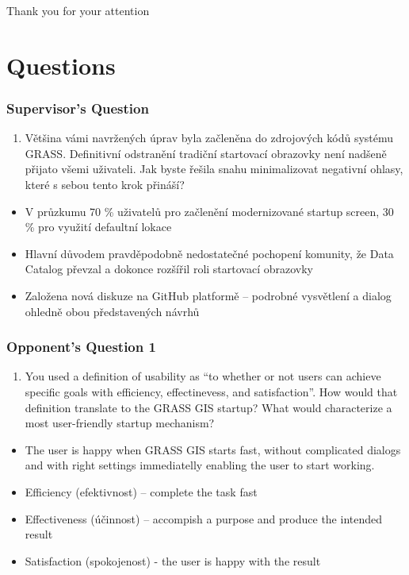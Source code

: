 \documentclass[aspectratio=169]{beamer}
\begin{document}
\begin{frame}
\begin{center}
{\fontsize{20}{40}\selectfont Thank you for your attention}
\end{center}
\end{frame}

\section{Questions}

\begin{frame}
\frametitle{Supervisor's Question}
\begin{enumerate}
\item{Většina vámi navržených úprav byla začleněna do zdrojových kódů systému GRASS. Definitivní odstranění tradiční startovací obrazovky není nadšeně přijato všemi uživateli. Jak byste řešila snahu minimalizovat negativní ohlasy, které s sebou tento krok přináší?}
\end{enumerate}
\begin{itemize}
\vspace{0.3cm}
\item{V průzkumu 70 \% uživatelů pro začlenění modernizované startup screen, 30 \% pro využití defaultní lokace}
\item{Hlavní důvodem pravděpodobně nedostatečné pochopení komunity, že Data Catalog převzal a dokonce rozšířil roli startovací obrazovky}
\item{Založena nová diskuze na GitHub platformě -- podrobné vysvětlení a dialog ohledně obou představených návrhů}

\end{itemize}
\end{frame}

\begin{frame}
\frametitle{Opponent's Question 1}
\begin{enumerate}
\item{You used a definition of usability as ``to whether or not users can achieve specific goals with efficiency, effectinevess, and satisfaction''. How would that definition translate to the GRASS GIS startup? What would characterize a most user-friendly startup mechanism?}
\end{enumerate}
\begin{itemize}
\vspace{0.3cm}
\item{The user is happy when GRASS GIS starts fast, without complicated dialogs and with right settings immediatelly enabling the user to start working.}
\vspace{0.3cm}
\item{Efficiency (efektivnost) -- complete the task fast}
\item{Effectiveness (účinnost) -- accompish a purpose and produce the intended result}
\item{Satisfaction (spokojenost) - the user is happy with the result}
\end{itemize}
\end{frame}
\end{document}
